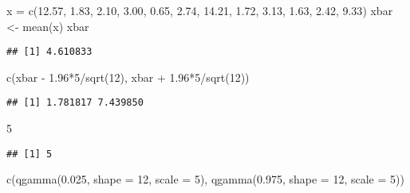 \documentclass[
]{book}
\newenvironment{Shaded}{\begin{snugshade}}{\end{snugshade}}
\newcommand{\AttributeTok}[1]{\textcolor[rgb]{0.77,0.63,0.00}{#1}}
\newcommand{\DecValTok}[1]{\textcolor[rgb]{0.00,0.00,0.81}{#1}}
\newcommand{\FloatTok}[1]{\textcolor[rgb]{0.00,0.00,0.81}{#1}}
\newcommand{\FunctionTok}[1]{\textcolor[rgb]{0.00,0.00,0.00}{#1}}
\newcommand{\NormalTok}[1]{#1}
\newcommand{\OtherTok}[1]{\textcolor[rgb]{0.56,0.35,0.01}{#1}}
\newcommand{\SpecialCharTok}[1]{\textcolor[rgb]{0.00,0.00,0.00}{#1}}
\begin{document}
\begin{Shaded}
\begin{Highlighting}[]
\NormalTok{x }\OtherTok{=} \FunctionTok{c}\NormalTok{(}\FloatTok{12.57}\NormalTok{,  }\FloatTok{1.83}\NormalTok{,  }\FloatTok{2.10}\NormalTok{,  }\FloatTok{3.00}\NormalTok{,  }\FloatTok{0.65}\NormalTok{,  }\FloatTok{2.74}\NormalTok{, }\FloatTok{14.21}\NormalTok{,  }\FloatTok{1.72}\NormalTok{,  }\FloatTok{3.13}\NormalTok{,  }\FloatTok{1.63}\NormalTok{,  }\FloatTok{2.42}\NormalTok{,  }\FloatTok{9.33}\NormalTok{)}
\NormalTok{xbar }\OtherTok{\textless{}{-}} \FunctionTok{mean}\NormalTok{(x)}
\NormalTok{xbar}
\end{Highlighting}
\end{Shaded}

\begin{verbatim}
## [1] 4.610833
\end{verbatim}

\begin{Shaded}
\begin{Highlighting}[]
\FunctionTok{c}\NormalTok{(xbar }\SpecialCharTok{{-}} \FloatTok{1.96}\SpecialCharTok{*}\DecValTok{5}\SpecialCharTok{/}\FunctionTok{sqrt}\NormalTok{(}\DecValTok{12}\NormalTok{), xbar }\SpecialCharTok{+} \FloatTok{1.96}\SpecialCharTok{*}\DecValTok{5}\SpecialCharTok{/}\FunctionTok{sqrt}\NormalTok{(}\DecValTok{12}\NormalTok{))}
\end{Highlighting}
\end{Shaded}

\begin{verbatim}
## [1] 1.781817 7.439850
\end{verbatim}

\begin{Shaded}
\begin{Highlighting}[]
\DecValTok{5}
\end{Highlighting}
\end{Shaded}

\begin{verbatim}
## [1] 5
\end{verbatim}

\begin{Shaded}
\begin{Highlighting}[]
\FunctionTok{c}\NormalTok{(}\FunctionTok{qgamma}\NormalTok{(}\FloatTok{0.025}\NormalTok{, }\AttributeTok{shape =} \DecValTok{12}\NormalTok{, }\AttributeTok{scale =} \DecValTok{5}\NormalTok{), }\FunctionTok{qgamma}\NormalTok{(}\FloatTok{0.975}\NormalTok{, }\AttributeTok{shape =} \DecValTok{12}\NormalTok{, }\AttributeTok{scale =} \DecValTok{5}\NormalTok{))}
\end{Highlighting}
\end{Shaded}
\end{document}

